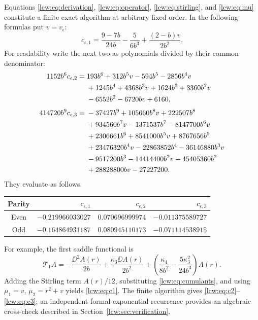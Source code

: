 \documentclass[11pt,letterpaper]{article}
\theoremstyle{remark}\newtheorem{remark}[theorem]{Remark}
\newcommand{\TT}{\mathcal T}\newcommand{\PP}{\mathcal P}
\begin{document}
Equations \eqref{lcw:eq:derivation}, \eqref{lcw:eq:operator}, \eqref{lcw:eq:stirling}, and \eqref{lcw:eq:mu} constitute a finite exact algorithm at arbitrary fixed order. In the following formulas put $v=v_\epsilon$:
\begin{equation}\label{lcw:eq:c1}
 c_{\epsilon,1}=\frac{9-7b}{24b}-\frac{5}{6b^3}
              +\frac{(2-b)v}{2b^2}.
\end{equation}
For readability write the next two as polynomials divided by their common denominator:
\begin{align}
 1152b^6c_{\epsilon,2}={}&193b^6+312b^5v-594b^5-2856b^4v\notag\\
 &+1245b^4+4368b^3v+1624b^3+3360b^2v\notag\\
 &-6552b^2-6720bv+6160,\label{lcw:eq:c2}\\[3pt]
 414720b^9c_{\epsilon,3}={}&-37427b^9+105660b^8v+222507b^8\notag\\
 &+934560b^7v-1371537b^7-8147700b^6v\notag\\
 &+2306661b^6+8541000b^5v+8767656b^5\notag\\
 &+23476320b^4v-22863852b^4-36146880b^3v\notag\\
 &-9517200b^3-14414400b^2v+45405360b^2\notag\\
 &+28828800bv-27227200.\label{lcw:eq:c3}
\end{align}
They evaluate as follows:
\begin{center}
\begin{tabular}{crrr}
\toprule
Parity & $c_{\epsilon,1}$ & $c_{\epsilon,2}$ & $c_{\epsilon,3}$\\
\midrule
Even & $-0.219966033027$ & $0.070696999974$ & $-0.011375589727$\\
Odd & $-0.164864931187$ & $0.080945110173$ & $-0.071114538915$\\
\bottomrule
\end{tabular}
\end{center}

For example, the first saddle functional is
\begin{equation}\label{lcw:eq:T1}
 \TT_1 A=-\frac{\DD^2A(r)}{2b}
 +\frac{\kappa_3\DD A(r)}{2b^2}
 +\left(\frac{\kappa_4}{8b^2}-\frac{5\kappa_3^2}{24b^3}\right)A(r).
\end{equation}
Adding the Stirling term $A(r)/12$, substituting \eqref{lcw:eq:cumulants}, and using $\mu_1=v$, $\mu_2=r^2+v$ yields \eqref{lcw:eq:c1}. The finite algorithm gives \eqref{lcw:eq:c2}--\eqref{lcw:eq:c3}; an independent formal-exponential recurrence provides an algebraic cross-check described in Section~\ref{lcw:sec:verification}.
\end{document}
